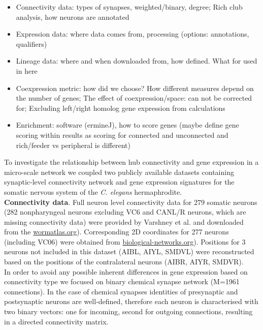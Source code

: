 \documentclass[10pt,letterpaper]{article}
\begin{document}
\begin{itemize}
    \item{Connectivity data: types of synapses, weighted/binary, degree; Rich club analysis, how neurons are annotated}
    \item{Expression data: where data comes from, processing (options: annotations, qualifiers)}
    \item{Lineage data: where and when downloaded from, how defined. What for used in here}
    \item{Coexpression metric: how did we choose? How different measures depend on the number of genes; The effect of coexpression/space: can not be corrected for; Excluding left/right homolog gene expression from calculations}
    \item{Enrichment: software (ermineJ), how to score genes (maybe define gene scoring within results as scoring for connected and unconnected and rich/feeder vs peripheral is different)}
    
\end{itemize}    
To investigate the relationship between hub connectivity and gene expression in a micro-scale network we coupled two publicly available datasets containing synaptic-level connectivity network and gene expression signatures for the somatic nervous system of the \textit{C. elegans} hermaphrodite.\\

\textbf{Connectivity data}. Full neuron level connectivity data for 279 somatic neurons (282 nonpharyngeal neurons excluding VC6 and CANL/R neurons, which are missing connectivity data) were provided by Varshney et al. \cite{Varshney2011} and downloaded from the  \href{http://www.wormatlas.org/neuronalwiring.html#NeuronalconnectivityII}{wormatlas.org}). 
Corresponding 2D coordinates for 277 neurons (including VC06) were obtained from \href{www.biological-networks.org/?page_id=25}{biological-networks.org}). 
Positions for 3 neurons not included in this dataset (AIBL, AIYL, SMDVL) were reconstructed based on the positions of the contralateral neurons (AIBR, AIYR, SMDVR).  \\ 
In order to avoid any possible inherent differences in gene expression based on connectivity type we focused on binary chemical synapse network (M=1961 connections).
In the case of chemical synapses identities of presynaptic and postsynaptic neurons are well-defined, therefore each neuron is characterised with two binary vectors: one for incoming, second for outgoing connections, resulting in a directed connectivity matrix.
\end{document}
